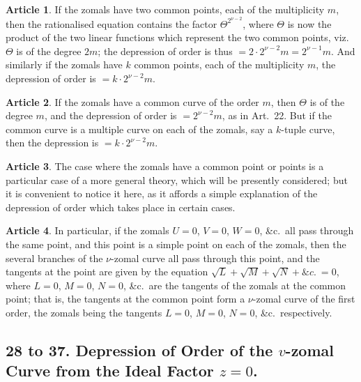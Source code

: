 \documentclass[11pt,a4paper]{article}
\theoremstyle{definition}
\newtheorem{art}{Article}
\begin{document}
\begin{art}
If the zomals have two common points, each of the multiplicity $m$, then the rationalised equation contains the factor $\Theta^{2^{\nu-2}}$, where $\Theta$ is now the product of the two linear functions which represent the two common points, viz.\ $\Theta$ is of the degree $2m$; the depression of order is thus $= 2 \cdot 2^{\nu-2}m = 2^{\nu-1}m$. And similarly if the zomals have $k$ common points, each of the multiplicity $m$, the depression of order is $= k \cdot 2^{\nu-2}m$.
\end{art}

\begin{art}
If the zomals have a common curve of the order $m$, then $\Theta$ is of the degree $m$, and the depression of order is $= 2^{\nu-2}m$, as in Art.\ 22. But if the common curve is a multiple curve on each of the zomals, say a $k$-tuple curve, then the depression is $= k \cdot 2^{\nu-2}m$.
\end{art}

\begin{art}
The case where the zomals have a common point or points is a particular case of a more general theory, which will be presently considered; but it is convenient to notice it here, as it affords a simple explanation of the depression of order which takes place in certain cases.
\end{art}

\begin{art}
In particular, if the zomals $U = 0$, $V = 0$, $W = 0$, \&c.\ all pass through the same point, and this point is a simple point on each of the zomals, then the several branches of the $\nu$-zomal curve all pass through this point, and the tangents at the point are given by the equation $\sqrt{L} + \sqrt{M} + \sqrt{N} + \&c.\ = 0$, where $L = 0$, $M = 0$, $N = 0$, \&c.\ are the tangents of the zomals at the common point; that is, the tangents at the common point form a $\nu$-zomal curve of the first order, the zomals being the tangents $L = 0$, $M = 0$, $N = 0$, \&c.\ respectively.
\end{art}

\subsection*{28 to 37. Depression of Order of the $v$-zomal Curve from the Ideal Factor $z = 0$.}
\end{document}
